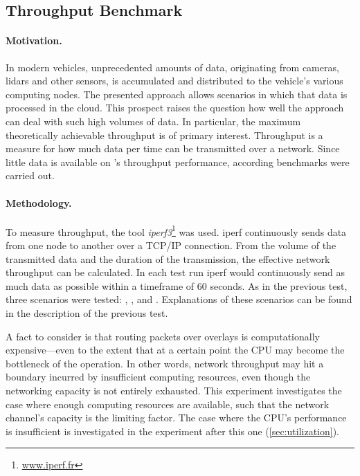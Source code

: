 \subsection{Throughput Benchmark} \label{sec:throughput}
\paragraph{Motivation.} 
In modern vehicles, unprecedented amounts of data, originating from cameras, lidars and other sensors, is accumulated and distributed to the vehicle's various computing nodes. The presented approach allows scenarios in which that data is processed in the cloud. This prospect raises the question how well the approach can deal with such high volumes of data. In particular, the maximum theoretically achievable throughput is of primary interest. Throughput is a measure for how much data per time can be transmitted over a network. Since little data is available on \wnet 's throughput performance, according benchmarks were carried out.

\paragraph{Methodology.} To measure throughput, the tool \emph{iperf3}\footnote{\url{www.iperf.fr}} was used. iperf continuously sends data from one node to another over a TCP/IP connection. From the volume of the transmitted data and the duration of the transmission, the effective network throughput can be calculated. In each test run iperf would continuously send as much data as possible within a timeframe of 60 seconds. As in the previous test, three scenarios were tested:  , , and . Explanations of these scenarios can be found in the description of the previous test. 

A fact to consider is that routing packets over overlays is computationally expensive---even to the extent that at a certain point the CPU may become the bottleneck of the operation. In other words, network throughput may hit a boundary incurred by insufficient computing resources, even though the networking capacity is not entirely exhausted. This experiment investigates the case where enough computing resources are available, such that the network channel's capacity is the limiting factor. The case where the CPU's performance is insufficient is investigated in the experiment after this one (\cf \ref{sec:utilization}).

